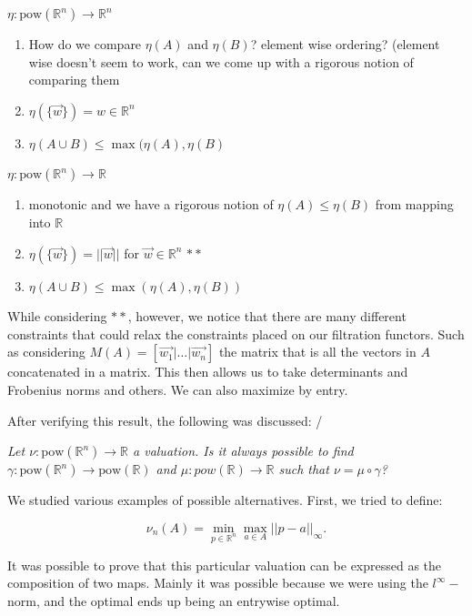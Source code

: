 \documentclass[a4paper,12pt,reqno, english]{amsart}
\newcommand{\pow}{\mathrm{pow}}
\newcommand{\set}[1]{\{ #1\}}
\newcommand{\R}{\mathbb{R}}
\theoremstyle{plain}
\theoremstyle{definition}
\begin{document}
$\eta:\pow (\R^n)\rightarrow \R^n$
\begin{enumerate}
\item How do we compare $\eta(A)$ and $\eta(B)$? element wise ordering? (element wise doesn't seem to work, can we come up with a rigorous notion of comparing them


\item $\eta(\set{\vec{w}})=w\in\R^n$

\item $\eta(A\cup B)\le \max(\eta(A),\eta(B)$

\end{enumerate}

$\eta:\pow(\R^n)\rightarrow \R$
\begin{enumerate}
\item monotonic and we have a rigorous notion of $\eta(A)\le \eta(B)$ from mapping into $\R$

\item $\eta(\set{\vec{w}})=||\vec{w}||$ for $\vec{w}\in\R^n$ $\ast\ast$

\item $\eta(A\cup B)\le \max(\eta(A),\eta(B))$
\end{enumerate}

While considering $\ast\ast$, however, we notice that there are many different constraints that could relax the constraints placed on our filtration functors. Such as considering $M(A)=\left[ \vec{w_1}| \dots|\vec{w_n}\right]$ the matrix that is all the vectors in $A$ concatenated in a matrix. This then allows us to take determinants and Frobenius norms and others. We can also maximize by entry.


After verifying this result, the following was discussed:
/
\begin{center}
{\it	Let $\nu: \pow(\mathbb{R}^{n}) \rightarrow \mathbb{R}$ a valuation. Is it always possible to find $\gamma: \pow(\mathbb{R}^{n})\rightarrow \pow(\mathbb{R})$ and $\mu:pow(\mathbb{R})\rightarrow \mathbb{R} $ such that $\nu= \mu\circ \gamma $?}
\end{center}

We studied various examples of possible alternatives. First, we tried to define:

  $$ \nu_n(A)= \min_{p\in \mathbb{R}^n} \max_{a\in A}|| p-a||_{\infty}.$$

It was possible to prove that this particular valuation can be expressed as the composition of two maps. Mainly it was possible because we were using the $l^{\infty}-$norm, and the optimal ends up being an entrywise optimal. 
\end{document}
